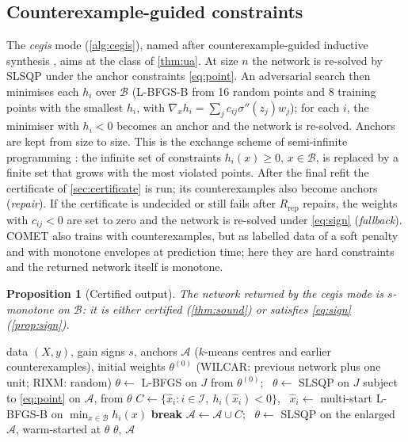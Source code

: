 \documentclass[preprint,12pt,authoryear]{elsarticle}
\newtheorem{proposition}{Proposition}
\newcommand{\B}{\mathcal{B}}
\newcommand{\I}{\mathcal{I}}
\newcommand{\A}{\mathcal{A}}
\newcommand{\sig}{\sigma}
\begin{document}
\subsection{Counterexample-guided constraints}\label{sec:cegis}
The \emph{cegis} mode (\cref{alg:cegis}), named after counterexample-guided inductive synthesis \citep{SolarLezama2006},
aims at the class of \cref{thm:ua}. At size $n$ the network is re-solved by SLSQP under the anchor constraints
\eqref{eq:point}. An adversarial search then minimises each $h_i$ over $\B$ (L-BFGS-B from 16 random points and 8
training points with the smallest $h_i$, with $\nabla_xh_i=\sum_jc_{ij}\sig''(z_j)w_j$); for each $i$, the minimiser
with $h_i<0$ becomes an anchor and the network is re-solved.
Anchors are kept from size to size. This is the exchange scheme of semi-infinite programming \citep{Hettich1993}: the
infinite set of constraints $h_i(x)\ge0$, $x\in\B$, is replaced by a finite set that grows with the most violated points.
After the final refit the certificate of \cref{sec:certificate} is run; its counterexamples also become anchors
(\emph{repair}). If the certificate is undecided or still fails after $R_{\mathrm{rep}}$ repairs, the weights with $c_{ij}<0$ are
set to zero and the network is re-solved under \eqref{eq:sign} (\emph{fallback}). COMET \citep{Sivaraman2020} also
trains with counterexamples, but as labelled data of a soft penalty and with monotone envelopes at prediction time; here
they are hard constraints and the returned network itself is monotone.

\begin{proposition}[Certified output]\label{prop:always}
The network returned by the cegis mode is $s$-monotone on $\B$: it is either certified (\cref{thm:sound}) or satisfies
\eqref{eq:sign} (\cref{prop:sign}).
\end{proposition}

\begin{algorithm*}[!tbp]
\caption{Constructive step $n$ in the cegis mode.}\label{alg:cegis}
\begin{algorithmic}[1]
\Require data $(X,y)$, gain signs $s$, anchors $\A$ ($k$-means centres and earlier counterexamples), initial weights
$\theta^{(0)}$ (WILCAR: previous network plus one unit; RIXM: random)
\State $\theta\gets$ L-BFGS on $J$ from $\theta^{(0)}$; \ $\theta\gets$ SLSQP on $J$ subject to \eqref{eq:point} on $\A$, from $\theta$
  \State $C\gets\{\hat x_i: i\in\I,\ h_i(\hat x_i)<0\}$, \ $\hat x_i\gets$ multi-start L-BFGS-B on $\min_{x\in\B}h_i(x)$
   \textbf{break} \EndIf
  \State $\A\gets\A\cup C$; \ $\theta\gets$ SLSQP on the enlarged $\A$, warm-started at $\theta$
\EndFor
\State \Return $\theta$, $\A$
\end{algorithmic}
\end{algorithm*}
\end{document}
